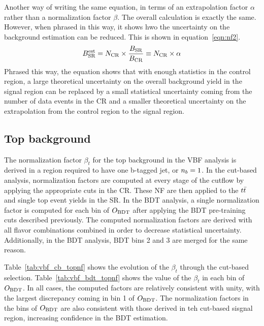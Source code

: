 Another way of writing the same equation, in terms of an extrapolation factor $\alpha$ rather than a normalization factor $\beta$. The overall calculation is exactly the same. However, when phrased in this way, it shows hwo the uncertainty on the background estimation can be reduced. This is shown in equation~\ref{eqn:nf2}.
%
\begin{equation}
B_{\rm SR}^{\rm est} = N_{\rm CR} \times \frac{B_{\rm SR}}{B_{\rm CR}} \equiv N_{\rm CR} \times \alpha
\label{eqn:nf2}
\end{equation}
%
Phrased this way, the equation shows that with enough statistics in the control region, a large theoretical uncertainty on the overall background yield in the signal region can be replaced by a small statistical uncertainty coming from the number of data events in the CR and a smaller theoretical uncertainty on the extrapolation from the control region to the signal region. 

\subsection{Top background}

The normalization factor $\beta_{t}$ for the top background in the VBF analysis is derived in a region required to have one b-tagged jet, or $n_b = 1$. In the cut-based analysis, normalization factors are computed at every stage of the cutflow by applying the appropriate cuts in the CR. These NF are then applied to the $t\bar{t}$ and single top event yields in the SR. In the BDT analysis, a single normalization factor is computed for each bin of $O_{\rm BDT}$ after applying the BDT pre-training cuts described previously. The computed normalization factors are derived with all flavor combinations combined in order to decrease statistical uncertainty. Additionally, in the BDT analysis, BDT bins 2 and 3 are merged for the same reason.

Table~\ref{tab:vbf_cb_topnf} shows the evolution of the $\beta_{t}$ through the cut-based selection. Table~\ref{tab:vbf_bdt_topnf} shows the value of the $\beta_{t}$ in each bin of $O_{\rm BDT}$. In all cases, the computed factors are relatively consistent with unity, with the largest discrepancy coming in bin 1 of $O_{\rm BDT}$. The normalization factors in the bins of $O_{\rm BDT}$ are also consistent with those derived in teh cut-based sisgnal region, increasing confidence in the BDT estimation. 

